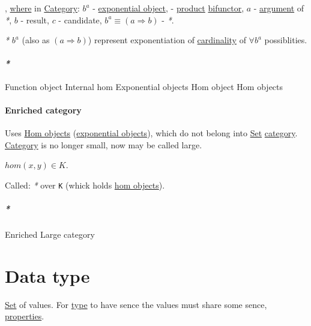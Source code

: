 \documentclass[a4paper,14pt,oneside]{book}
\begin{document}

, \hyperref[org6c63c7a]{where} in \hyperref[orge2e250a]{Category}: \(b^{a}\) - \hyperref[org61bd1f8]{exponential object}, \texttimes{} - \hyperref[org90a2f94]{product} \hyperref[org3f476fc]{bifunctor}, \(a\) - \hyperref[org4072c80]{argument} of \emph{*}, \(b\) - result, \(c\) - candidate, \(b^{a} \equiv ( a \Rightarrow b )\) - \emph{*}.

\emph{*} \(b^{a}\) (also as \((a \Rightarrow b)\)) represent exponentiation of \hyperref[org8f55d81]{cardinality} of \(\forall b^{a}\) possiblities.

\subsubsection{\emph{*}}
\label{sec:org63d2bb5}
\label{org1099e78}Function object
\label{orgc3d97ba}Internal hom
\label{orgf7ec26f}Exponential objects
\label{org6a826f3}Hom object
\label{orgada1455}Hom objects

\subsubsection{\label{orgeae7654}Enriched category}
\label{sec:org9c3cf27}
Uses \hyperref[orgada1455]{Hom objects} (\hyperref[orgf7ec26f]{exponential objects}), which do not belong into \hyperref[org128a409]{Set} \hyperref[orge2e250a]{category}.
\hyperref[orge2e250a]{Category} is no longer small, now may be called large.

\(hom(x,y) \in K\).

Called: \emph{*} over \texttt{K} (whick holds \hyperref[orgada1455]{hom objects}).

\paragraph{\emph{*}}
\label{sec:orga7048da}
\label{orgec71605}Enriched
\label{org6b32e03}Large category

\chapter{\label{org194580e}Data type}
\label{sec:orge24ed94}
\hyperref[org128a409]{Set} of values.
For \hyperref[org1eff537]{type} to have sence the values must share some sence, \hyperref[orgff8ecf0]{properties}.
\end{document}
